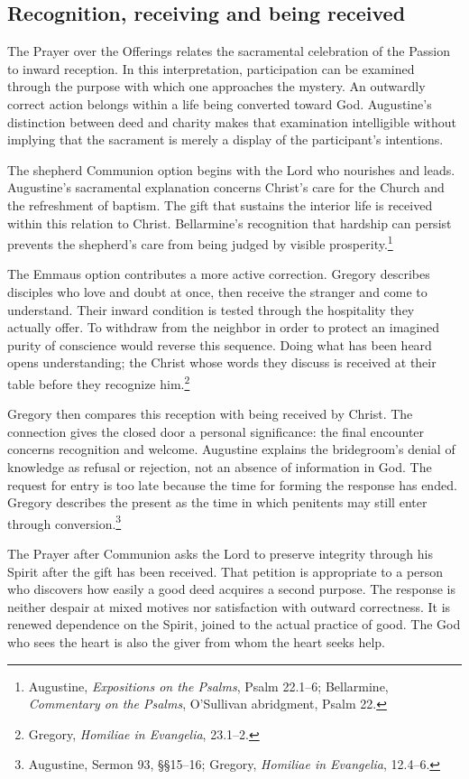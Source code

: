 \subsection{Recognition, receiving and being received}
The Prayer over the Offerings relates the sacramental celebration of the Passion to inward reception. In this interpretation, participation can be examined through the purpose with which one approaches the mystery. An outwardly correct action belongs within a life being converted toward God. Augustine's distinction between deed and charity makes that examination intelligible without implying that the sacrament is merely a display of the participant's intentions.

The shepherd Communion option begins with the Lord who nourishes and leads. Augustine's sacramental explanation concerns Christ's care for the Church and the refreshment of baptism. The gift that sustains the interior life is received within this relation to Christ. Bellarmine's recognition that hardship can persist prevents the shepherd's care from being judged by visible prosperity.\footnote{Augustine, \textit{Expositions on the Psalms}, Psalm 22.1--6; Bellarmine, \textit{Commentary on the Psalms}, O'Sullivan abridgment, Psalm 22.}

The Emmaus option contributes a more active correction. Gregory describes disciples who love and doubt at once, then receive the stranger and come to understand. Their inward condition is tested through the hospitality they actually offer. To withdraw from the neighbor in order to protect an imagined purity of conscience would reverse this sequence. Doing what has been heard opens understanding; the Christ whose words they discuss is received at their table before they recognize him.\footnote{Gregory, \textit{Homiliae in Evangelia}, 23.1--2.}

Gregory then compares this reception with being received by Christ. The connection gives the closed door a personal significance: the final encounter concerns recognition and welcome. Augustine explains the bridegroom's denial of knowledge as refusal or rejection, not an absence of information in God. The request for entry is too late because the time for forming the response has ended. Gregory describes the present as the time in which penitents may still enter through conversion.\footnote{Augustine, Sermon 93, §§15--16; Gregory, \textit{Homiliae in Evangelia}, 12.4--6.}

The Prayer after Communion asks the Lord to preserve integrity through his Spirit after the gift has been received. That petition is appropriate to a person who discovers how easily a good deed acquires a second purpose. The response is neither despair at mixed motives nor satisfaction with outward correctness. It is renewed dependence on the Spirit, joined to the actual practice of good. The God who sees the heart is also the giver from whom the heart seeks help.

